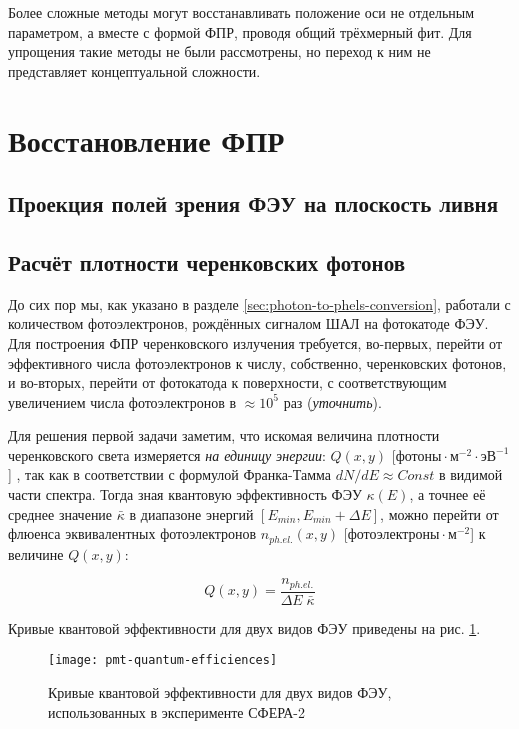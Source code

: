 Более сложные методы могут восстанавливать положение оси не отдельным параметром, а вместе с формой ФПР, проводя общий трёхмерный фит. Для упрощения такие методы не были рассмотрены, но переход к ним не представляет концептуальной сложности.

\section{Восстановление ФПР}

\subsection{Проекция полей зрения ФЭУ на плоскость ливня}

\subsection{Расчёт плотности черенковских фотонов}

До сих пор мы, как указано в разделе \ref{sec:photon-to-phels-conversion}, работали с количеством фотоэлектронов, рождённых сигналом ШАЛ на фотокатоде ФЭУ. Для построения ФПР черенковского излучения требуется, во-первых, перейти от эффективного числа фотоэлектронов к числу, собственно, черенковских фотонов, и во-вторых, перейти от фотокатода к поверхности, с соответствующим увеличением числа фотоэлектронов в $\approx 10^5$ раз (\textit{уточнить}).

Для решения первой задачи заметим, что искомая величина плотности черенковского света измеряется \textit{на единицу энергии}: $Q(x, y)$ [$\text{фотоны} \cdot \text{м}^{-2} \cdot \text{эВ}^{-1}$] \cite{Budnev2005}, так как в соответствии с формулой Франка-Тамма \cite{Tamm1939} $dN/dE \approx Const$ в видимой части спектра. Тогда зная квантовую эффективность ФЭУ $\kappa(E)$, а точнее её среднее значение $\bar{\kappa}$ в диапазоне энергий $[E_{min}, E_{min} + \Delta E]$, можно перейти от флюенса эквивалентных фотоэлектронов $n_{ph. el.} (x, y)$ [$\text{фотоэлектроны} \cdot \text{м}^{-2}$] к величине $Q(x, y)$:

\begin{equation}
	Q(x, y) = \frac{n_{ph. el.}}{\Delta E \; \bar{\kappa}}
\end{equation}

Кривые квантовой эффективности для двух видов ФЭУ приведены на рис. \ref{pic:pmt-quanteffs}.

\begin{figure}
	\centering
	\texttt{[image: pmt-quantum-efficiences]}
	\caption{Кривые квантовой эффективности для двух видов ФЭУ, использованных в эксперименте СФЕРА-2}
	\label{pic:pmt-quanteffs}
\end{figure}



